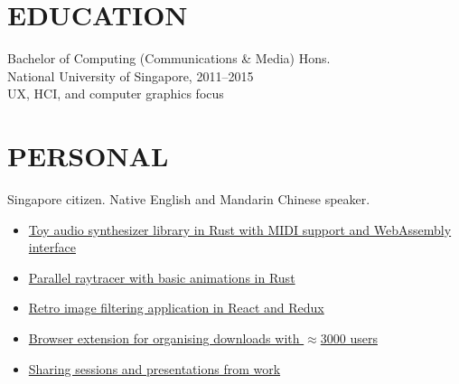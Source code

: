 \documentclass[line, margin]{res}
\begin{document}
\begin{resume}

    \section{EDUCATION}
        Bachelor of Computing (Communications \& Media) Hons. \\
        National University of Singapore, 2011--2015 \\
        UX, HCI, and computer graphics focus

    \section{PERSONAL}
        Singapore citizen. Native English and Mandarin Chinese speaker.
        \vspace{0.075cm}
        \begin{itemize}[leftmargin=*]
        \itemsep0em 
        \item \href{https://github.com/gyng/synthrs}{Toy audio synthesizer library in Rust with MIDI support and WebAssembly interface}
        \item \href{https://github.com/gyng/rust-raytracer}{Parallel raytracer with basic animations in Rust}
        \item \href{https://github.com/gyng/ditherer}{Retro image filtering application in React and Redux}
        \item \href{https://github.com/gyng/save-in}{Browser extension for organising downloads with $\approx$3000 users}
        \item \href{https://github.com/gyng/book}{Sharing sessions and presentations from work}
        \end{itemize}


\end{resume}
\end{document}
